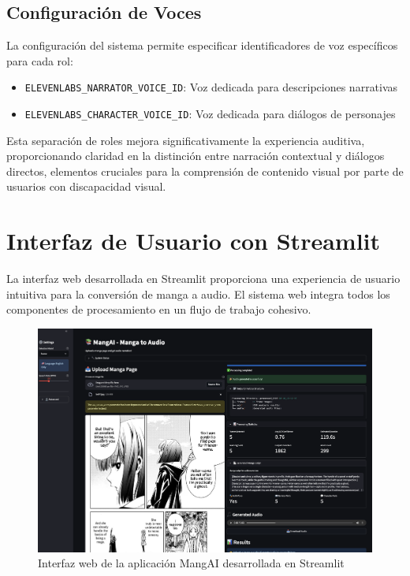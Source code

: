 \documentclass[conference]{IEEEtran}
\begin{document}
\subsection{Configuración de Voces}
La configuración del sistema permite especificar identificadores de voz específicos para cada rol:
\begin{itemize}
\item \texttt{ELEVENLABS\_NARRATOR\_VOICE\_ID}: Voz dedicada para descripciones narrativas
\item \texttt{ELEVENLABS\_CHARACTER\_VOICE\_ID}: Voz dedicada para diálogos de personajes
\end{itemize}

Esta separación de roles mejora significativamente la experiencia auditiva, proporcionando claridad en la distinción entre narración contextual y diálogos directos, elementos cruciales para la comprensión de contenido visual por parte de usuarios con discapacidad visual.

\section{Interfaz de Usuario con Streamlit}
La interfaz web desarrollada en Streamlit proporciona una experiencia de usuario intuitiva para la conversión de manga a audio. El sistema web integra todos los componentes de procesamiento en un flujo de trabajo cohesivo.

\begin{figure}[ht]
\centering
\includegraphics[width=\columnwidth]{resources/app.png}
\caption{Interfaz web de la aplicación MangAI desarrollada en Streamlit}
\label{fig:streamlit-interface}
\end{figure}
\end{document}
